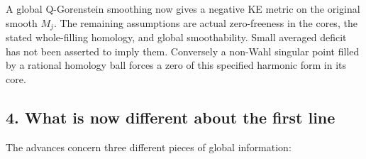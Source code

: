 \documentclass[
  11pt,
]{article}
\begin{document}
A global Q-Gorenstein smoothing now gives a negative KE metric on the
original smooth \(M_j\). The remaining assumptions are actual
zero-freeness in the cores, the stated whole-filling homology, and
global smoothability. Small averaged deficit has not been asserted to
imply them. Conversely a non-Wahl singular point filled by a rational
homology ball forces a zero of this specified harmonic form in its core.

\hypertarget{what-is-now-different-about-the-first-line}{%
\subsection{4. What is now different about the first
line}\label{what-is-now-different-about-the-first-line}}

The advances concern three different pieces of global information:
\end{document}
